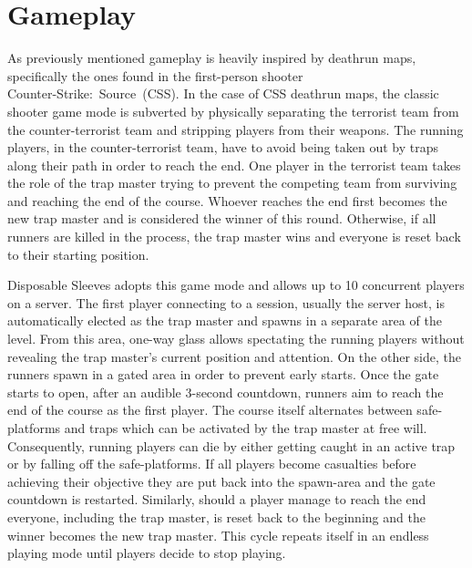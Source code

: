 \section{Gameplay} \label{sec:gameplay}

As previously mentioned gameplay is heavily inspired by deathrun maps, specifically the ones found in the first-person shooter \\ \mbox{Counter-Strike: Source (CSS)}.
In the case of CSS deathrun maps, the classic shooter game mode is subverted by physically separating the terrorist team from the counter-terrorist team and stripping players from their weapons.
The running players, in the counter-terrorist team, have to avoid being taken out by traps along their path in order to reach the end.
One player in the terrorist team takes the role of the trap master trying to prevent the competing team from surviving and reaching the end of the course.
Whoever reaches the end first becomes the new trap master and is considered the winner of this round.
Otherwise, if all runners are killed in the process, the trap master wins and everyone is reset back to their starting position.

Disposable Sleeves adopts this game mode and allows up to 10 concurrent players on a server.
The first player connecting to a session, usually the server host, is automatically elected as the trap master and spawns in a separate area of the level.
From this area, one-way glass allows spectating the running players without revealing the trap master's current position and attention.
On the other side, the runners spawn in a gated area in order to prevent early starts.
Once the gate starts to open, after an audible 3-second countdown, runners aim to reach the end of the course as the first player.
The course itself alternates between safe-platforms and traps which can be activated by the trap master at free will.
Consequently, running players can die by either getting caught in an active trap or by falling off the safe-platforms.
If all players become casualties before achieving their objective they are put back into the spawn-area and the gate countdown is restarted.
Similarly, should a player manage to reach the end everyone, including the trap master, is reset back to the beginning and the winner becomes the new trap master.
This cycle repeats itself in an endless playing mode until players decide to stop playing.